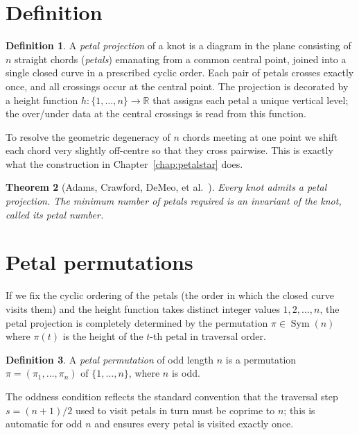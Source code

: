 \documentclass[11pt,oneside]{report}
\newtheorem{theorem}{Theorem}[chapter]
\theoremstyle{definition}
\newtheorem{definition}[theorem]{Definition}
\newcommand{\R}{\mathbb{R}}
\DeclareMathOperator{\Sym}{Sym}
\begin{document}
\section{Definition}

\begin{definition}
A \emph{petal projection} of a knot is a diagram in the plane consisting of $n$
straight chords (\emph{petals}) emanating from a common central point, joined
into a single closed curve in a prescribed cyclic order. Each pair of petals
crosses exactly once, and all crossings occur at the central point. The
projection is decorated by a height function $h \colon \{1, \dots, n\} \to \R$
that assigns each petal a unique vertical level; the over/under data at the
central crossings is read from this function.
\end{definition}

To resolve the geometric degeneracy of $n$ chords meeting at one point we
shift each chord very slightly off-centre so that they cross pairwise. This is
exactly what the construction in Chapter~\ref{chap:petalstar} does.

\begin{theorem}[Adams, Crawford, DeMeo, et al.~\cite{Adams}]
Every knot admits a petal projection. The minimum number of petals required
is an invariant of the knot, called its \emph{petal number}.
\end{theorem}

\section{Petal permutations}

If we fix the cyclic ordering of the petals (the order in which the closed
curve visits them) and the height function takes distinct integer values
$1, 2, \dots, n$, the petal projection is completely determined by the
permutation $\pi \in \Sym(n)$ where $\pi(t)$ is the height of the $t$-th
petal in traversal order.

\begin{definition}
A \emph{petal permutation} of odd length $n$ is a permutation
$\pi = (\pi_1, \dots, \pi_n)$ of $\{1, \dots, n\}$, where $n$ is odd.
\end{definition}

The oddness condition reflects the standard convention that the traversal step
$s = (n+1)/2$ used to visit petals in turn must be coprime to $n$; this is
automatic for odd $n$ and ensures every petal is visited exactly once.
\end{document}
